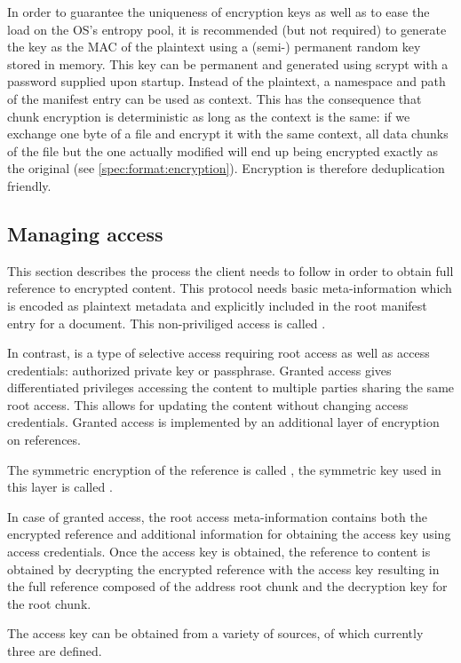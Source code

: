 In order to guarantee the uniqueness of encryption keys as well as to ease the load on the OS's entropy pool, it is recommended (but not required) to generate the key as the MAC of the plaintext using a (semi-) permanent random key stored in memory. 
This key can be permanent and generated using scrypt with a password supplied upon startup. Instead   of the plaintext, a namespace and path of the manifest entry can be used as context.
This has the consequence that chunk encryption is deterministic as long as the context is the same: if we exchange one byte of a file and encrypt it with the same context, all data chunks of the file but the one actually modified will end up being encrypted exactly as the original (see \ref{spec:format:encryption}). Encryption is therefore deduplication friendly. 


\subsection{Managing access}\label{sec:managing-access}

This section describes the process the client needs to follow in order to obtain full reference to encrypted content. This protocol needs basic meta-information which is encoded as plaintext metadata and explicitly included in the root manifest entry for a document. This non-priviliged access is called .

In contrast,  is a type of selective access requiring root access as well as access credentials: authorized private key or passphrase. Granted access gives differentiated privileges accessing the content to multiple parties sharing the same root access. This allows for updating the content without changing access credentials. Granted access is implemented by an additional layer of encryption on references.

The symmetric encryption of the reference is called , the symmetric key used in this layer is called
.

In case of granted access, the root access meta-information contains both the encrypted reference and additional information for obtaining the access key using access credentials. Once the access key is obtained, the reference to content is obtained by decrypting the encrypted reference with the access key resulting in the full reference composed of the address root chunk and the decryption key for the root chunk. 

The access key can be obtained from a variety of sources, of which currently three are defined.

